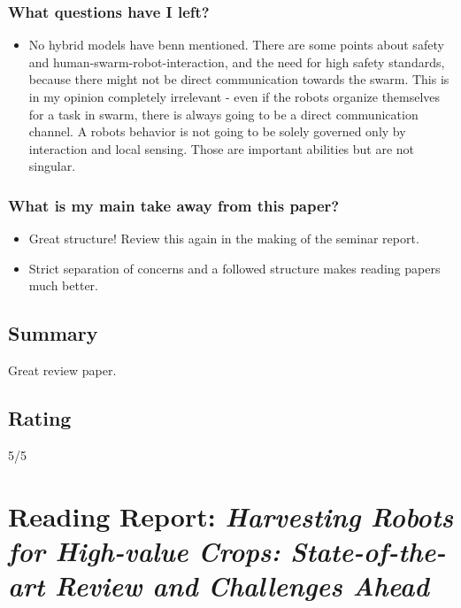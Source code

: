 \documentclass{article}
\begin{document}
\subsubsection*{What questions have I left?}
\begin{itemize}
    \item No hybrid models have benn mentioned. There are some points about safety and human-swarm-robot-interaction, and the need for high safety standards, because there might not be direct communication towards the swarm. This is in my opinion completely irrelevant - even if the robots organize themselves for a task in swarm, there is always going to be a direct communication channel. A robots behavior is not going to be solely governed only by interaction and local sensing. Those are important abilities but are not singular.    
\end{itemize}
\subsubsection*{What is my main take away from this paper?}
\begin{itemize}
    \item Great structure! Review this again in the making of the seminar report. 
    \item Strict separation of concerns and a followed structure makes reading papers much better.
\end{itemize}

\subsection*{Summary}
Great review paper.

\subsection*{Rating}
5/5

\section{Reading Report: \emph{Harvesting Robots for High-value Crops: State-of-the-art Review and Challenges Ahead}}
\cite{Bac2014}
\end{document}
